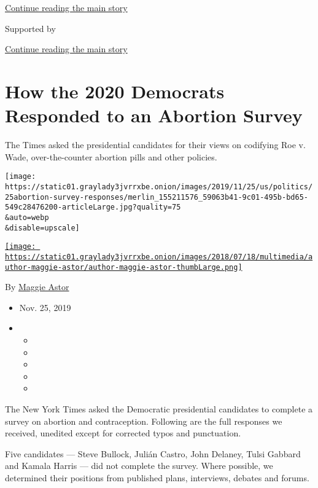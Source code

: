 \protect\hyperlink{after-top}{Continue reading the main story}

Supported by

\protect\hyperlink{after-sponsor}{Continue reading the main story}

\hypertarget{how-the-2020-democrats-responded-to-an-abortion-survey}{%
\section{How the 2020 Democrats Responded to an Abortion
Survey}\label{how-the-2020-democrats-responded-to-an-abortion-survey}}

The Times asked the presidential candidates for their views on codifying
Roe v. Wade, over-the-counter abortion pills and other policies.

\texttt{[image: https://static01.graylady3jvrrxbe.onion/images/2019/11/25/us/politics/25abortion-survey-responses/merlin\_155211576\_59063b41-9c01-495b-bd65-549c28476200-articleLarge.jpg?quality=75\\\&auto=webp\\\&disable=upscale]}

\href{https://www.nytimes3xbfgragh.onion/by/maggie-astor}{\texttt{[image: https://static01.graylady3jvrrxbe.onion/images/2018/07/18/multimedia/author-maggie-astor/author-maggie-astor-thumbLarge.png]}}

By \href{https://www.nytimes3xbfgragh.onion/by/maggie-astor}{Maggie
Astor}

\begin{itemize}
\item
  Nov. 25, 2019
\item
  \begin{itemize}
  \item
  \item
  \item
  \item
  \item
  \end{itemize}
\end{itemize}

The New York Times asked the Democratic presidential candidates to
complete a survey on abortion and contraception. Following are the full
responses we received, unedited except for corrected typos and
punctuation.

Five candidates --- Steve Bullock, Julián Castro, John Delaney, Tulsi
Gabbard and Kamala Harris --- did not complete the survey. Where
possible, we determined their positions from published plans,
interviews, debates and forums.

